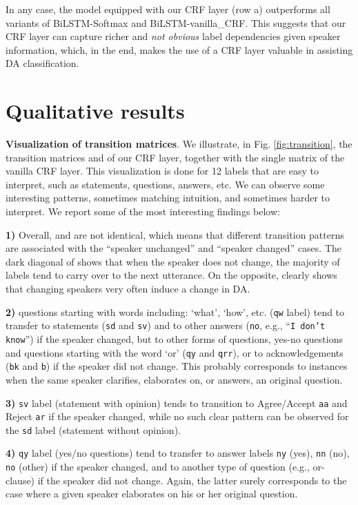 \documentclass[11pt,a4paper]{article}
\begin{document}
In any case, the model equipped with our CRF layer (row a) outperforms all variants of BiLSTM-Softmax and BiLSTM-vanilla\_CRF.
This suggests that our CRF layer can capture richer and \textit{not obvious} label dependencies given speaker information, which, in the end, makes the use of a CRF layer valuable in assisting DA classification.

\section{Qualitative results}
\noindent \textbf{Visualization of transition matrices}.
We illustrate, in Fig. \ref{fig:transition}, the transition matrices  and  of our CRF layer, together with the single matrix  of the vanilla CRF layer.
This visualization is done for 12 labels that are easy to interpret, such as statements, questions, answers, etc. 
We can observe some interesting patterns, sometimes matching intuition, and sometimes harder to interpret.
We report some of the most interesting findings below:

\noindent \textbf{1)} Overall,  and  are not identical, which means that different transition patterns are associated with the ``speaker unchanged'' and ``speaker changed'' cases. 
The dark diagonal of  shows that when the speaker does not change, the majority of labels tend to carry over to the next utterance.
On the opposite,  clearly shows that changing speakers very often induce a change in DA.

\noindent \textbf{2)} questions starting with words including: `what', `how', etc. (\texttt{qw} label) tend to transfer to statements (\texttt{sd} and \texttt{sv}) and to other answers (\texttt{no}, e.g., ``{\small\texttt{I don't know}}'') if the speaker changed, but to other forms of questions, yes-no questions and questions starting with the word `or' (\texttt{qy} and \texttt{qrr}), or to acknowledgements (\texttt{bk} and \texttt{b}) if the speaker did not change.
This probably corresponds to instances when the same speaker clarifies, elaborates on, or answers, an original question.


\noindent \textbf{3)} \texttt{sv} label (statement with opinion) tends to transition to Agree/Accept \texttt{aa} and Reject \texttt{ar} if the speaker changed, while no such clear pattern can be observed for the \texttt{sd} label (statement without opinion).

\noindent \textbf{4)} \texttt{qy} label (yes/no questions) tend to transfer to answer labels \texttt{ny} (yes), \texttt{nn} (no), \texttt{no} (other) if the speaker changed, and to another type of question (e.g., or-clause) if the speaker did not change.
Again, the latter surely corresponds to the case where a given speaker elaborates on his or her original question.
\end{document}
